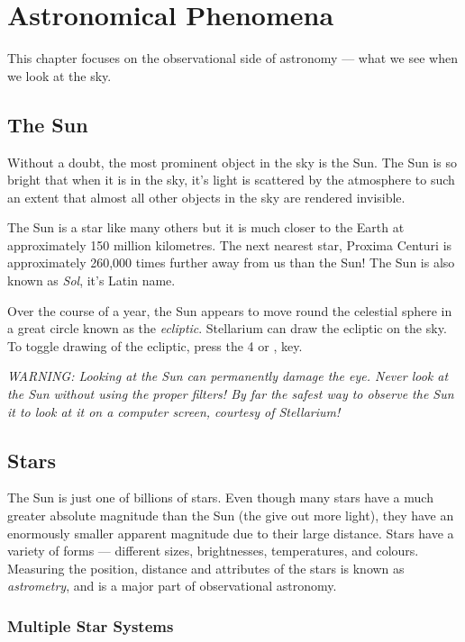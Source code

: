 
\chapter{Astronomical Phenomena}

This chapter focuses on the observational side of astronomy --- what we
see when we look at the sky.

\section{The Sun}\label{the-sun}

Without a doubt, the most prominent object in the sky is the Sun. The
Sun is so bright that when it is in the sky, it's light is scattered by
the atmosphere to such an extent that almost all other objects in the
sky are rendered invisible.

The Sun is a star like many others but it is much closer to the Earth at
approximately 150 million kilometres. The next nearest star, Proxima
Centuri is approximately 260,000 times further away from us than the
Sun! The Sun is also known as \emph{Sol}, it's Latin name.

Over the course of a year, the Sun appears to move round the celestial
sphere in a great circle known as the \emph{ecliptic}. Stellarium can
draw the ecliptic on the sky. To toggle drawing of the ecliptic, press
the 4 or , key.

\emph{WARNING: Looking at the Sun can permanently damage the eye. Never
look at the Sun without using the proper filters! By far the safest way
to observe the Sun it to look at it on a computer screen, courtesy of
Stellarium!}

\section{Stars}\label{stars}

The Sun is just one of billions of stars. Even though many stars have a
much greater absolute magnitude than the Sun (the give out more light),
they have an enormously smaller apparent magnitude due to their large
distance. Stars have a variety of forms --- different sizes,
brightnesses, temperatures, and colours. Measuring the position,
distance and attributes of the stars is known as \emph{astrometry}, and
is a major part of observational astronomy.

\subsection{Multiple Star Systems}\label{multiple-star-systems}

